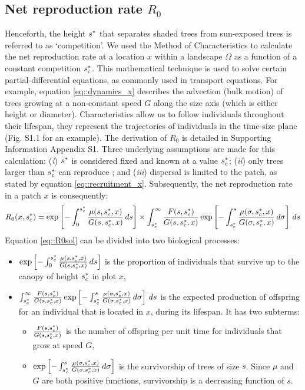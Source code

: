 \subsection{Net reproduction rate $ R_0 $}
Henceforth, the height $ {s}^{*} $ that separates shaded trees from sun-exposed trees is referred to as `competition'. We used the Method of Characteristics \citep{Olver2014b} to calculate the net reproduction rate at a location $ x $ within a landscape $ \Omega $ as a function of a constant competition $ {s}^{*}_c $. This mathematical technique is used to solve certain partial-differential equations, as commonly used in transport equations. For example, equation \eqref{eq::dynamics_x} describes the advection (bulk motion) of trees growing at a non-constant speed $ G $ along the size axis (which is either height or diameter). Characteristics allow us to follow individuals throughout their lifespan, \ie they represent the trajectories of individuals in the time-size plane (Fig. S1.1 for an example). The derivation of $ R_0 $ is detailed in Supporting Information Appendix S1. Three underlying assumptions are made for this calculation: (\textit{i}) $ {s}^{*} $ is considered fixed and known at a value $ {s}^{*}_c $; (\textit{ii}) only trees larger than $ {s}^{*}_c $ can reproduce \citep{Strigul2008}; and (\textit{iii}) dispersal is limited to the patch, as stated by equation \eqref{eq::recruitment_x}. Subsequently, the net reproduction rate in a patch $ x $ is consequently:
\begin{equation} \label{eq::R0sol}
	R_0 (x, {s}^{*}_c) = \exp \left[-\int_0^{{s}^{*}_c}\frac{\mu(s, {s}^{*}_c, x)}{G(s, {s}^{*}_c, x)} \, ds \right] \times \int_{{s}^{*}_c}^{\infty} \frac{F(s, {s}^{*}_c)}{G(s, {s}^{*}_c, x)} \exp \left[-\int_{{s}^{*}_c}^{s} \frac{\mu(\sigma, {s}^{*}_c, x)}{G(\sigma, {s}^{*}_c, x)} \, d\sigma \right] \, ds
\end{equation}
Equation \eqref{eq::R0sol} can be divided into two biological processes:
\begin{itemize}
	\item $ \exp\left[-\int_0^{{s}^{*}_c}\frac{\mu(s, {s}^{*}_c, x)}{G(s, {s}^{*}_c, x)} \, ds \right] $ is the proportion of individuals that survive up to the canopy of height $ {s}^{*}_c $ in plot $ x $,
	\item $ \int_{{s}^{*}_c}^{\infty} \frac{F(s, {s}^{*}_c)}{G(s, {s}^{*}_c, x)} \exp \left[-\int_{{s}^{*}_c}^{s} \frac{\mu(\sigma, {s}^{*}_c, x)}{G(\sigma, {s}^{*}_c, x)} \, d\sigma \right] \, ds $ is the expected production of offspring for an individual that is located in $ x $, during its lifespan. It has two subterms:
	\begin{itemize}[label=\Large $ \centerdot $] %
		\item $ \frac{F(s, {s}^{*}_c)}{G(s, {s}^{*}_c, x)} $ is the number of offspring per unit time for individuals that grow at speed $ G $,
		\item $ \exp \left[-\int_{{s}^{*}_c}^{s} \frac{\mu(\sigma, {s}^{*}_c, x)}{G(\sigma, {s}^{*}_c, x)} \, d\sigma \right] $ is the survivorship of trees of size $ s $. Since $ \mu $ and $ G $ are both positive functions, survivorship is a decreasing function of $ s $.
	\end{itemize}
\end{itemize}

